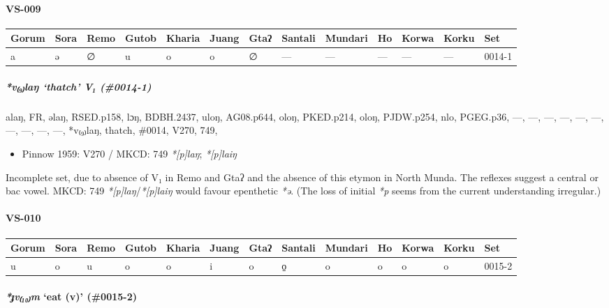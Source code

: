 \documentclass[a4paper,]{article}
\providecommand{\tightlist}{%
  \setlength{\itemsep}{0pt}\setlength{\parskip}{0pt}}
\let\oldparagraph\paragraph
\renewcommand{\paragraph}[1]{\oldparagraph{#1}\mbox{}}
\let\oldsubparagraph\subparagraph
\renewcommand{\subparagraph}[1]{\oldsubparagraph{#1}\mbox{}}
\begin{document}
\paragraph{VS-009}\label{vs-009}

\begin{longtable}[]{@{}lllllllllllll@{}}
\toprule
Gorum & Sora & Remo & Gutob & Kharia & Juang & Gtaʔ & Santali & Mundari
& Ho & Korwa & Korku & Set\tabularnewline
\midrule
\endhead
a & ə & ∅ & u & o & o & ∅ & --- & --- & --- & --- & --- &
0014-1\tabularnewline
\bottomrule
\end{longtable}

\subparagraph{\texorpdfstring{\emph{*v₍₉₎laŋ} `thatch' V₁
(\#0014-1)}{*v₍₉₎laŋ thatch V₁ (\#0014-1)}}\label{vlaux14b-thatch-v-0014-1}

alaŋ, FR, əlaŋ, RSED.p158, lɔŋ, BDBH.2437, uloŋ, AG08.p644, oloŋ,
PKED.p214, oloŋ, PJDW.p254, nlo, PGEG.p36, ---, ---, ---, ---, ---, ---,
---, ---, ---, ---, *v₍₉₎laŋ, thatch, \#0014, V270, 749,

\begin{itemize}
\tightlist
\item
  Pinnow 1959: V270 / MKCD: 749 \emph{*{[}p{]}laŋ}; \emph{*{[}p{]}laiŋ}
\end{itemize}

Incomplete set, due to absence of V₁ in Remo and Gtaʔ and the absence of
this etymon in North Munda. The reflexes suggest a central or bac vowel.
MKCD: 749 \emph{*{[}p{]}laŋ}/\emph{*{[}p{]}laiŋ} would favour epenthetic
\emph{*ə}. (The loss of initial \emph{*p} seems from the current
understanding irregular.)

\paragraph{VS-010}\label{vs-010}

\begin{longtable}[]{@{}lllllllllllll@{}}
\toprule
Gorum & Sora & Remo & Gutob & Kharia & Juang & Gtaʔ & Santali & Mundari
& Ho & Korwa & Korku & Set\tabularnewline
\midrule
\endhead
u & o & u & o & o & i & o & o̠ & o & o & o & o & 0015-2\tabularnewline
\bottomrule
\end{longtable}

\paragraph{\texorpdfstring{\emph{*ɟv₍₁₀₎m} `eat (v)'
(\#0015-2)}{*ɟv₍₁₀₎m eat (v) (\#0015-2)}}\label{ux25fvm-eat-v-0015-2}
\end{document}
